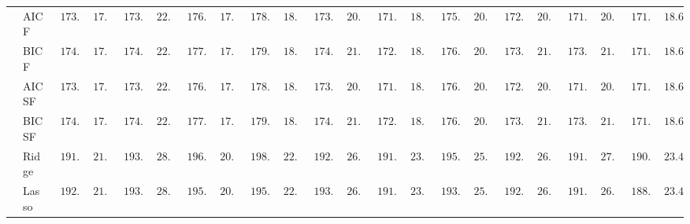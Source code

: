 \begin{tabular}{ll|ll|llllll|llllll|llllll}
 & AIC F  & $\phantom{0}173.23$ & $\phantom{0}17.57$ & $\phantom{0}173.84$ & $\phantom{0}22.43$ & $\phantom{0}176.76$ & $\phantom{0}17.03$ & $\phantom{0}178.14$ & $\phantom{0}18.35$ & $\phantom{0}173.35$ & $\phantom{0}20.89$ & $\phantom{0}171.88$ & $\phantom{0}18.53$ & $\phantom{0}175.99$ & $\phantom{0}20.94$ & $\phantom{0}172.66$ & $\phantom{0}20.85$ & $\phantom{0}171.87$ & $\phantom{0}20.90$ & $\phantom{0}171.12$ & $\phantom{0}18.64$ \\
 & BIC F  & $\phantom{0}174.33$ & $\phantom{0}17.71$ & $\phantom{0}174.93$ & $\phantom{0}22.61$ & $\phantom{0}177.92$ & $\phantom{0}17.21$ & $\phantom{0}179.05$ & $\phantom{0}18.33$ & $\phantom{0}174.65$ & $\phantom{0}21.00$ & $\phantom{0}172.92$ & $\phantom{0}18.72$ & $\phantom{0}176.85$ & $\phantom{0}20.99$ & $\phantom{0}173.70$ & $\phantom{0}21.08$ & $\phantom{0}173.01$ & $\phantom{0}21.03$ & $\phantom{0}171.97$ & $\phantom{0}18.65$ \\
 & AIC SF  & $\phantom{0}173.23$ & $\phantom{0}17.57$ & $\phantom{0}173.84$ & $\phantom{0}22.43$ & $\phantom{0}176.76$ & $\phantom{0}17.03$ & $\phantom{0}178.14$ & $\phantom{0}18.35$ & $\phantom{0}173.35$ & $\phantom{0}20.89$ & $\phantom{0}171.88$ & $\phantom{0}18.53$ & $\phantom{0}176.00$ & $\phantom{0}20.94$ & $\phantom{0}172.67$ & $\phantom{0}20.86$ & $\phantom{0}171.87$ & $\phantom{0}20.90$ & $\phantom{0}171.12$ & $\phantom{0}18.64$ \\
 & BIC SF  & $\phantom{0}174.33$ & $\phantom{0}17.71$ & $\phantom{0}174.93$ & $\phantom{0}22.61$ & $\phantom{0}177.92$ & $\phantom{0}17.21$ & $\phantom{0}179.05$ & $\phantom{0}18.33$ & $\phantom{0}174.65$ & $\phantom{0}21.00$ & $\phantom{0}172.92$ & $\phantom{0}18.72$ & $\phantom{0}176.85$ & $\phantom{0}20.99$ & $\phantom{0}173.70$ & $\phantom{0}21.08$ & $\phantom{0}173.01$ & $\phantom{0}21.03$ & $\phantom{0}171.97$ & $\phantom{0}18.65$ \\
 & Ridge  & $\phantom{0}191.77$ & $\phantom{0}21.86$ & $\phantom{0}193.35$ & $\phantom{0}28.38$ & $\phantom{0}196.58$ & $\phantom{0}20.41$ & $\phantom{0}198.62$ & $\phantom{0}22.26$ & $\phantom{0}192.24$ & $\phantom{0}26.55$ & $\phantom{0}191.25$ & $\phantom{0}23.18$ & $\phantom{0}195.76$ & $\phantom{0}25.24$ & $\phantom{0}192.23$ & $\phantom{0}26.69$ & $\phantom{0}191.67$ & $\phantom{0}27.17$ & $\phantom{0}190.39$ & $\phantom{0}23.43$ \\
 & Lasso  & $\phantom{0}192.92$ & $\phantom{0}21.58$ & $\phantom{0}193.63$ & $\phantom{0}28.26$ & $\phantom{0}195.37$ & $\phantom{0}20.09$ & $\phantom{0}195.62$ & $\phantom{0}22.02$ & $\phantom{0}193.27$ & $\phantom{0}26.27$ & $\phantom{0}191.51$ & $\phantom{0}23.06$ & $\phantom{0}193.37$ & $\phantom{0}25.25$ & $\phantom{0}192.81$ & $\phantom{0}26.10$ & $\phantom{0}191.13$ & $\phantom{0}26.68$ & $\phantom{0}188.30$ & $\phantom{0}23.49$ \\

\end{tabular}
